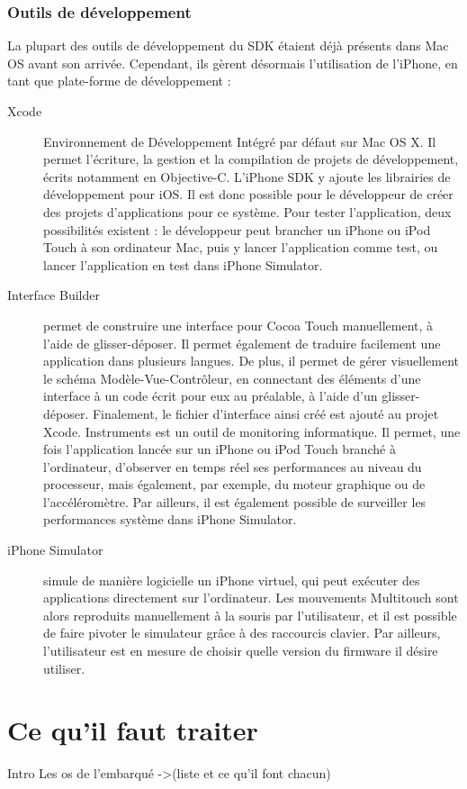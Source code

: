 \documentclass[a4paper,12pt]{report}
\begin{document}
\begin{onehalfspace}
\subsection*{Outils de développement}
La plupart des outils de développement du SDK étaient déjà présents dans Mac OS avant son arrivée. Cependant, ils gèrent désormais l'utilisation de l'iPhone, en tant que plate-forme de développement :
\begin{description}
\item[Xcode] Environnement de Développement Intégré par défaut sur Mac OS X. Il permet l'écriture, la gestion et la compilation de projets de développement, écrits notamment en Objective-C. L'iPhone SDK y ajoute les librairies de développement pour iOS. Il est donc possible pour le développeur de créer des projets d'applications pour ce système. Pour tester l'application, deux possibilités existent : le développeur peut brancher un iPhone ou iPod Touch à son ordinateur Mac, puis y lancer l'application comme test, ou lancer l'application en test dans iPhone Simulator.
\item[Interface Builder] permet de construire une interface pour Cocoa Touch manuellement, à l'aide de glisser-déposer. Il permet également de traduire facilement une application dans plusieurs langues. De plus, il permet de gérer visuellement le schéma Modèle-Vue-Contrôleur, en connectant des éléments d'une interface à un code écrit pour eux au préalable, à l'aide d'un glisser-déposer. Finalement, le fichier d'interface ainsi créé est ajouté au projet Xcode.
Instruments est un outil de monitoring informatique. Il permet, une fois l'application lancée sur un iPhone ou iPod Touch branché à l'ordinateur, d'observer en temps réel ses performances au niveau du processeur, mais également, par exemple, du moteur graphique ou de l'accéléromètre. Par ailleurs, il est également possible de surveiller les performances système dans iPhone Simulator.
\item[iPhone Simulator] simule de manière logicielle un iPhone virtuel, qui peut exécuter des applications directement sur l'ordinateur. Les mouvements Multitouch sont alors reproduits manuellement à la souris par l'utilisateur, et il est possible de faire pivoter le simulateur grâce à des raccourcis clavier. Par ailleurs, l'utilisateur est en mesure de choisir quelle version du firmware il désire utiliser.
\end{description}

\chapter*{Ce qu'il faut traiter}
Intro
  Les os de l'embarqué
  ->(liste et ce qu'il font chacun)


\end{onehalfspace}
\end{document}

